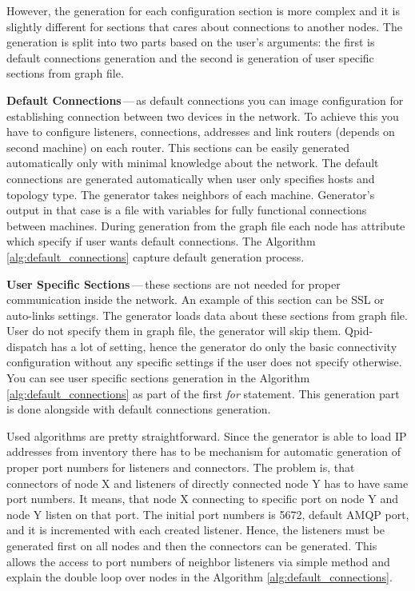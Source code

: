 However, the generation for each configuration section is more complex and it is slightly different for sections that cares about connections to another nodes. The generation is split into two parts based on the user's arguments: the first is default connections generation and the second is generation of user specific sections from graph file.


\begin{description}
	\item \textbf{Default Connections}\,---\,as default connections you can image configuration for establishing connection between two devices in the network. To achieve this you have to configure listeners, connections, addresses and link routers (depends on second machine) on each router. This sections can be easily generated automatically only with minimal knowledge about the network. The default connections are generated automatically when user only specifies hosts and topology type. The generator takes neighbors of each machine. Generator's output in that case is a file with variables for fully functional connections between machines. During generation from the graph file each node has attribute which specify if user wants default connections. The Algorithm \ref{alg:default_connections} capture default generation process.

	\item \textbf{User Specific Sections}\,---\,these sections are not needed for proper communication inside the network. An example of this section can be SSL or auto-links settings. The generator loads data about these sections from graph file. User do not specify them in graph file, the generator will skip them. Qpid-dispatch has a lot of setting, hence the generator do only the basic connectivity configuration without any specific settings if the user does not specify otherwise. You can see user specific sections generation in the Algorithm \ref{alg:default_connections} as part of the first \emph{for} statement. This generation part is done alongside with default connections generation.

\end{description}

Used algorithms are pretty straightforward. Since the generator is able to load IP addresses from inventory there has to be mechanism for automatic generation of proper port numbers for listeners and connectors. The problem is, that connectors of node X and listeners of directly connected node Y has to have same port numbers. It means, that node X connecting to specific port on node Y and node Y listen on that port. The initial port numbers is 5672, default AMQP port, and it is incremented with each created listener. Hence, the listeners must be generated first on all nodes and then the connectors can be generated. This allows the access to port numbers of neighbor listeners via simple method and explain the double loop over nodes in the Algorithm \ref{alg:default_connections}.

